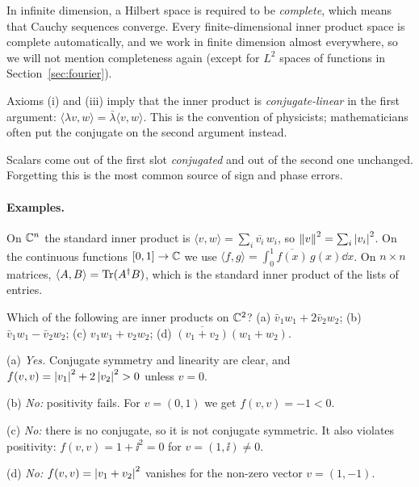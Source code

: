 \begin{remark}
  In infinite dimension, a Hilbert space is required to be \emph{complete}, which means that Cauchy sequences converge. Every finite-dimensional inner product space is complete automatically, and we work in finite dimension almost everywhere, so we will not mention completeness again (except for $L^2$ spaces of functions in Section~\ref{sec:fourier}).
\end{remark}

Axioms (i) and (iii) imply that the inner product is \emph{conjugate-linear} in the first argument: $\langle\lambda v,w\rangle=\bar\lambda\langle v,w\rangle$. This is the convention of physicists; mathematicians often put the conjugate on the second argument instead.

\begin{pitfall}
  Scalars come out of the first slot \emph{conjugated} and out of the second one unchanged. Forgetting this is the most common source of sign and phase errors.
\end{pitfall}

\paragraph{Examples.}
On $\mathbb{C}^n$ the standard inner product is $\langle v,w\rangle=\sum_i\overline{v_i}\,w_i$, so $\left\|v\right\|^2=\sum_i\left|v_i\right|^2$. On the continuous functions $[0,1]\to\mathbb{C}$ we use $\langle f,g\rangle=\int_0^1\overline{f(x)}\,g(x)\dd x$. On $n\times n$ matrices, $\langle A,B\rangle=\operatorname{Tr}(A^\dagger B)$, which is the standard inner product of the lists of entries.

\begin{example}\label{ex:isinner}
  Which of the following are inner products on $\mathbb{C}^2$? (a) $\bar v_1w_1+2\bar v_2w_2$; (b) $\bar v_1w_1-\bar v_2w_2$; (c) $v_1w_1+v_2w_2$; (d) $\overline{(v_1+v_2)}(w_1+w_2)$.
\end{example}
\begin{solution}
  \begin{steps}
    \item (a) \emph{Yes.} Conjugate symmetry and linearity are clear, and $f(v,v)=\left|v_1\right|^2+2\left|v_2\right|^2>0$ unless $v=0$.
    \item (b) \emph{No:} positivity fails. For $v=(0,1)$ we get $f(v,v)=-1<0$.
    \item (c) \emph{No:} there is no conjugate, so it is not conjugate symmetric. It also violates positivity: $f(v,v)=1+\ii^2=0$ for $v=(1,\ii)\neq0$.
    \item (d) \emph{No:} $f(v,v)=\left|v_1+v_2\right|^2$ vanishes for the non-zero vector $v=(1,-1)$.
  \end{steps}
\end{solution}

